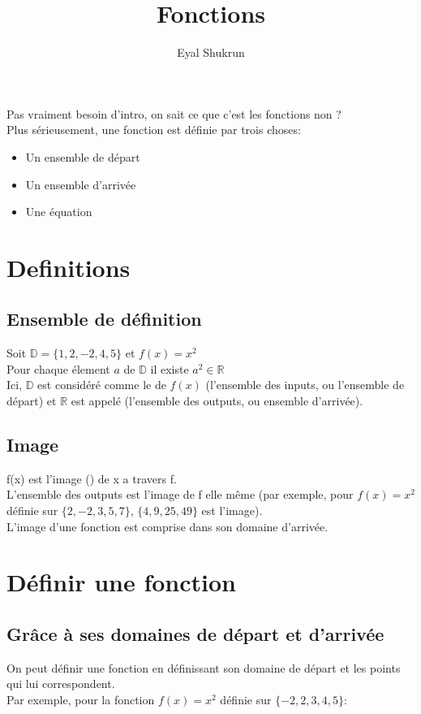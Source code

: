 \documentclass{article}
\title{Fonctions}
\author{Eyal Shukrun}
\begin{document}
\maketitle
Pas vraiment besoin d'intro, on sait ce que c'est les fonctions non ?\\

Plus sérieusement, une fonction est définie par trois choses:
\begin{itemize}
  \item Un ensemble de départ
  \item Un ensemble d'arrivée
  \item Une équation
\end{itemize}


\section{Definitions}
\subsection{Ensemble de définition}
Soit $\mathbb{D} = \{1, 2, -2, 4, 5\}$ et $f(x) = x^2$\\
Pour chaque élement $a$ de $\mathbb{D}$ il existe $a^2 \in \mathbb{R}$\\
Ici, $\mathbb{D}$ est considéré comme le  de $f(x)$ (l'ensemble des inputs, ou l'ensemble de départ) et $\mathbb{R}$ est appelé  (l'ensemble des outputs, ou ensemble d'arrivée).\\
\subsection{Image}
f(x) est l'image () de x a travers f.\\
L'ensemble des outputs est l'image de f elle même (par exemple, pour $f(x) = x^2$ définie sur $\{2, -2, 3, 5, 7\}$, 
$\{4, 9, 25, 49\}$ est l'image).\\
L'image d'une fonction est comprise dans son domaine d'arrivée.

\section{Définir une fonction}
\subsection{Grâce à ses domaines de départ et d'arrivée}
On peut définir une fonction en définissant son domaine de départ et les points qui lui correspondent.\\
Par exemple, pour la fonction $f(x) = x^2$ définie sur $\{-2, 2, 3, 4, 5\}$:
\end{document}
